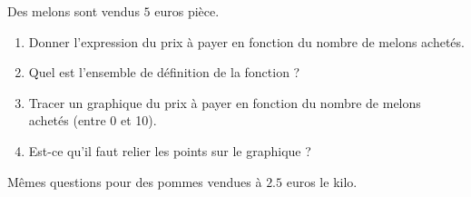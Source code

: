 
\begin{exercice}\label{exoSeconde-0059}

Des melons sont vendus $5$ euros pièce. 
\begin{enumerate}
    \item
        Donner l'expression du prix à payer en fonction du nombre de melons achetés. 
    \item
        Quel est l'ensemble de définition de la fonction ?
    \item
        Tracer un graphique du prix à payer en fonction du nombre de melons achetés (entre 0 et 10).
    \item
        Est-ce qu'il faut relier les points sur le graphique ?
\end{enumerate}

Mêmes questions pour des pommes vendues à \( 2.5\) euros le kilo. 

\end{exercice}
